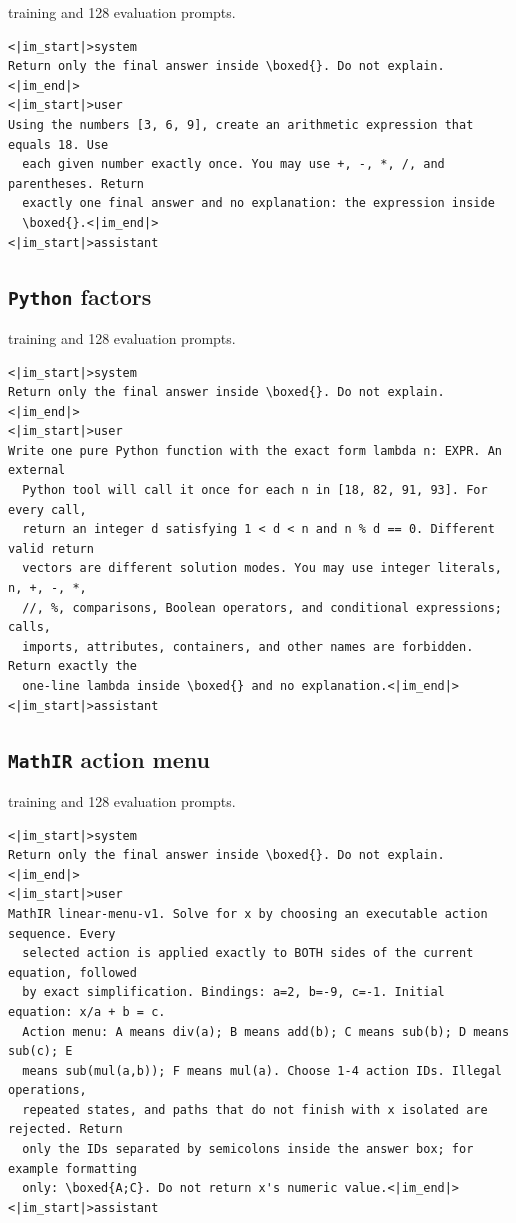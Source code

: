 \documentclass{article}
\newcommand{\1}{\mathbf 1}
\theoremstyle{remark}
\theoremstyle{definition}
\theoremstyle{plain}
\begin{document}
 training and 128 evaluation prompts.

\begin{Verbatim}[fontsize=\scriptsize,frame=single,framesep=4pt,rulecolor=\color{black!25},samepage=true]
<|im_start|>system
Return only the final answer inside \boxed{}. Do not explain.<|im_end|>
<|im_start|>user
Using the numbers [3, 6, 9], create an arithmetic expression that equals 18. Use
  each given number exactly once. You may use +, -, *, /, and parentheses. Return
  exactly one final answer and no explanation: the expression inside
  \boxed{}.<|im_end|>
<|im_start|>assistant
\end{Verbatim}

\filbreak
\subsection{\texttt{Python} factors}
\label{app:prompt-python}

 training and 128 evaluation prompts.

\begin{Verbatim}[fontsize=\scriptsize,frame=single,framesep=4pt,rulecolor=\color{black!25},samepage=true]
<|im_start|>system
Return only the final answer inside \boxed{}. Do not explain.<|im_end|>
<|im_start|>user
Write one pure Python function with the exact form lambda n: EXPR. An external
  Python tool will call it once for each n in [18, 82, 91, 93]. For every call,
  return an integer d satisfying 1 < d < n and n % d == 0. Different valid return
  vectors are different solution modes. You may use integer literals, n, +, -, *,
  //, %, comparisons, Boolean operators, and conditional expressions; calls,
  imports, attributes, containers, and other names are forbidden. Return exactly the
  one-line lambda inside \boxed{} and no explanation.<|im_end|>
<|im_start|>assistant
\end{Verbatim}

\filbreak
\subsection{\texttt{MathIR} action menu}
\label{app:prompt-mathir}

 training and 128 evaluation prompts.

\begin{Verbatim}[fontsize=\scriptsize,frame=single,framesep=4pt,rulecolor=\color{black!25},samepage=true]
<|im_start|>system
Return only the final answer inside \boxed{}. Do not explain.<|im_end|>
<|im_start|>user
MathIR linear-menu-v1. Solve for x by choosing an executable action sequence. Every
  selected action is applied exactly to BOTH sides of the current equation, followed
  by exact simplification. Bindings: a=2, b=-9, c=-1. Initial equation: x/a + b = c.
  Action menu: A means div(a); B means add(b); C means sub(b); D means sub(c); E
  means sub(mul(a,b)); F means mul(a). Choose 1-4 action IDs. Illegal operations,
  repeated states, and paths that do not finish with x isolated are rejected. Return
  only the IDs separated by semicolons inside the answer box; for example formatting
  only: \boxed{A;C}. Do not return x's numeric value.<|im_end|>
<|im_start|>assistant
\end{Verbatim}
\end{document}

